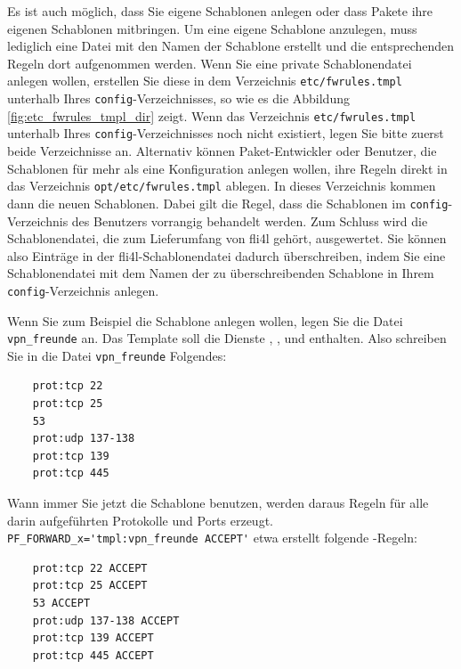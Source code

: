 Es ist auch möglich, dass Sie eigene Schablonen anlegen oder dass
Pakete ihre eigenen Schablonen mitbringen. Um eine eigene
Schablone anzulegen, muss lediglich eine Datei mit den Namen der
Schablone erstellt und die entsprechenden Regeln dort
aufgenommen werden. Wenn Sie eine private Schablonendatei anlegen wollen,
erstellen Sie diese in dem Verzeichnis \verb+etc/fwrules.tmpl+ unterhalb Ihres
\texttt{config}-Verzeichnisses, so wie es die Abbildung
\ref{fig:etc_fwrules_tmpl_dir} zeigt. Wenn das Verzeichnis
\texttt{etc/fwrules.tmpl} unterhalb Ihres \texttt{config}-Verzeichnisses noch
nicht existiert, legen Sie bitte zuerst beide Verzeichnisse an. Alternativ
können Paket-Entwickler oder Benutzer, die Schablonen für mehr als eine
Konfiguration anlegen wollen, ihre Regeln direkt in das Verzeichnis
\texttt{opt/etc/fwrules.tmpl} ablegen. In dieses Verzeichnis kommen dann die
neuen Schablonen. Dabei gilt die Regel, dass die Schablonen im
\texttt{config}-Verzeichnis des Benutzers vorrangig behandelt werden.
Zum Schluss wird die Schablonendatei, die zum Lieferumfang von
fli4l gehört, ausgewertet. Sie können also Einträge in der fli4l-Schablonendatei
dadurch \glqq{}überschreiben\grqq{}, indem Sie eine
Schablonendatei mit dem Namen der zu überschreibenden Schablone in Ihrem
\texttt{config}-Verzeichnis anlegen.

Wenn Sie zum Beispiel die Schablone  anlegen wollen, legen
Sie die Datei \texttt{vpn\_freunde} an. Das Template soll die Dienste
, ,  und  enthalten.
Also schreiben Sie in die Datei \texttt{vpn\_freunde} Folgendes:

\begin{example}
\begin{verbatim}
    prot:tcp 22
    prot:tcp 25
    53
    prot:udp 137-138
    prot:tcp 139
    prot:tcp 445
\end{verbatim}
\end{example}

\noindent Wann immer Sie jetzt die Schablone  benutzen,
werden daraus Regeln für alle darin aufgeführten Protokolle und Ports erzeugt.
\verb+PF_FORWARD_x='tmpl:vpn_freunde ACCEPT'+ etwa erstellt folgende
-Regeln:

\begin{example}
\begin{verbatim}
    prot:tcp 22 ACCEPT
    prot:tcp 25 ACCEPT
    53 ACCEPT
    prot:udp 137-138 ACCEPT
    prot:tcp 139 ACCEPT
    prot:tcp 445 ACCEPT
\end{verbatim}
\end{example}

